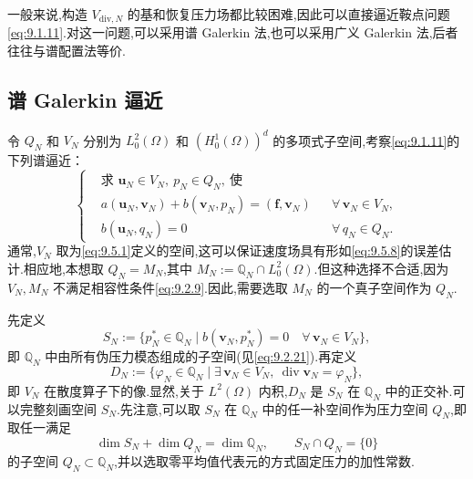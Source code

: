 一般来说,构造 \(V_{\mathrm{div},N}\) 的基和恢复压力场都比较困难,因此可以直接逼近鞍点问题\eqref{eq:9.1.11}.对这一问题,可以采用谱 Galerkin 法,也可以采用广义 Galerkin 法,后者往往与谱配置法等价.

\subsection{谱 Galerkin 逼近}\label{sec:9.5.1}

令 \(Q_N\) 和 \(V_N\) 分别为 \(L_0^2(\Omega)\) 和 \((H_0^1(\Omega))^d\) 的多项式子空间,考察\eqref{eq:9.1.11}的下列谱逼近：
\begin{equation}\label{eq:9.5.9}
  \left\{
  \begin{aligned}
    &\text{求 }\boldsymbol{u}_N\in V_N,\ p_N\in Q_N,\ \text{使}\\
    &a(\boldsymbol{u}_N,\boldsymbol{v}_N)+b(\boldsymbol{v}_N,p_N)=(\boldsymbol{f},\boldsymbol{v}_N)
         &&\forall\,\boldsymbol{v}_N\in V_N,\\
    &b(\boldsymbol{u}_N,q_N)=0&&\forall\,q_N\in Q_N.
  \end{aligned}
  \right.
\end{equation}
通常,\(V_N\) 取为\eqref{eq:9.5.1}定义的空间,这可以保证速度场具有形如\eqref{eq:9.5.8}的误差估计.相应地,本想取 \(Q_N=M_N\),其中 \(M_N:=\mathbb Q_N\cap L_0^2(\Omega)\).但这种选择不合适,因为 \(V_N,M_N\) 不满足相容性条件\eqref{eq:9.2.9}.因此,需要选取 \(M_N\) 的一个真子空间作为 \(Q_N\).

先定义
\begin{equation}\label{eq:9.5.10}
  S_N:=\{p_N^*\in\mathbb Q_N\mid b(\boldsymbol{v}_N,p_N^*)=0\quad
                  \forall\,\boldsymbol{v}_N\in V_N\},
\end{equation}
即 \(\mathbb Q_N\) 中由所有伪压力模态组成的子空间(见\eqref{eq:9.2.21}).再定义
\begin{equation}\label{eq:9.5.11}
  D_N:=\{\varphi_N\in\mathbb Q_N\mid
          \exists\,\boldsymbol{v}_N\in V_N,\ \operatorname{div}\boldsymbol{v}_N=\varphi_N\},
\end{equation}
即 \(V_N\) 在散度算子下的像.显然,关于 \(L^2(\Omega)\) 内积,\(D_N\) 是 \(S_N\) 在 \(\mathbb Q_N\) 中的正交补.可以完整刻画空间 \(S_N\).先注意,可以取 \(S_N\) 在 \(\mathbb Q_N\) 中的任一补空间作为压力空间 \(Q_N\),即取任一满足
\begin{equation}\label{eq:9.5.12}
  \dim S_N+\dim Q_N=\dim\mathbb Q_N,\qquad S_N\cap Q_N=\{0\}
\end{equation}
的子空间 \(Q_N\subset\mathbb Q_N\),并以选取零平均值代表元的方式固定压力的加性常数.

